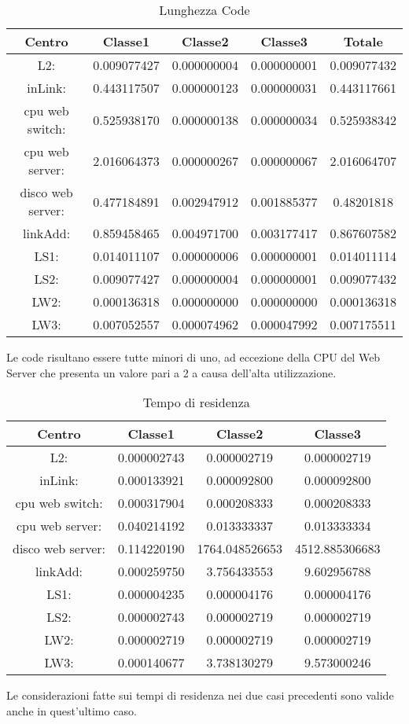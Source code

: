 \begin{table}[htbp]
\begin{center}
\begin{tabular}{|c|c|c|c|c|}
\hline
Centro &Classe1 &Classe2 &Classe3 &Totale\\
\hline
\hline
L2: &0.009077427 &0.000000004 &0.000000001 &0.009077432\\
\hline
inLink: &0.443117507 &0.000000123 &0.000000031 &0.443117661\\
\hline
cpu web switch: &0.525938170 &0.000000138 &0.000000034 &0.525938342\\
\hline
cpu web server: &2.016064373 &0.000000267 &0.000000067 &2.016064707\\
\hline
disco web server: &0.477184891 &0.002947912 &0.001885377 &0.48201818\\
\hline
linkAdd: &0.859458465 &0.004971700 &0.003177417 &0.867607582\\
\hline
LS1: &0.014011107 &0.000000006 &0.000000001 &0.014011114\\
\hline
LS2: &0.009077427 &0.000000004 &0.000000001 &0.009077432\\
\hline
LW2: &0.000136318 &0.000000000 &0.000000000 &0.000136318\\
\hline
LW3: &0.007052557 &0.000074962 &0.000047992 &0.007175511\\
\end{tabular}
\end{center}
\caption{Lunghezza Code}
\label{lunghezzacode}
\end{table}
Le code risultano essere tutte minori di uno, ad eccezione della CPU del Web Server che presenta un valore pari a 2 a causa dell'alta utilizzazione.
\begin{table}[htbp]
\begin{center}
\begin{tabular}{|c|c|c|c|}
\hline
Centro &Classe1 &Classe2 &Classe3\\
\hline
\hline
L2: &0.000002743 &0.000002719 &0.000002719\\
\hline
inLink: &0.000133921 &0.000092800 &0.000092800\\
\hline
cpu web switch: &0.000317904 &0.000208333 &0.000208333\\
\hline
cpu web server: &0.040214192 &0.013333337 &0.013333334\\
\hline
disco web server: &0.114220190 &1764.048526653 &4512.885306683\\
\hline
linkAdd: &0.000259750 &3.756433553 &9.602956788\\
\hline
LS1: &0.000004235 &0.000004176 &0.000004176\\
\hline
LS2: &0.000002743 &0.000002719 &0.000002719\\
\hline
LW2: &0.000002719 &0.000002719 &0.000002719\\
\hline
LW3: &0.000140677 &3.738130279 &9.573000246\\
\hline
\end{tabular}
\end{center}
\caption{Tempo di residenza}
\label{tempodiresidenza}
\end{table}
Le considerazioni fatte sui tempi di residenza nei due casi precedenti sono valide anche in quest'ultimo caso. 
